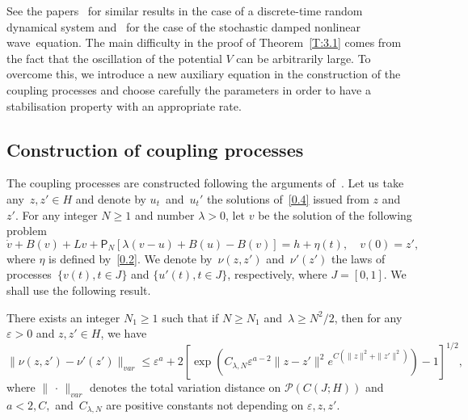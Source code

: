 \documentclass[10pt]{amsart}
\theoremstyle{definition}\newtheorem{defi}[theo]{Definition}\newtheorem{rema}[theo]{Remark}\newtheorem{exam}[theo]{Example}\newtheorem{exem}[theo]{Example}\newtheorem{nota}[theo]{Notation}
\newcommand{\e}{\varepsilon}
\newcommand{\PP}{{\mathcal P}}
\newcommand{\la}{\lambda}
\begin{document}
See the papers~\cite{JNPS-2012, JNPS-2014, MN-2017} for similar results in the case of a discrete-time random dynamical system and~\cite{MN-2015} for the case of the stochastic damped nonlinear wave~equation. The main difficulty in the proof of Theorem~\ref{T:3.1} comes from the fact that the oscillation of the potential $V$ can be arbitrarily large. To overcome this, we introduce a new auxiliary equation in the construction of the coupling processes and choose carefully the parameters in order to have a stabilisation property with an appropriate rate.

\subsection{Construction of coupling processes} \label{S:3.1}

The coupling processes are constructed following the arguments of~\cite{MN-2015}. Let us take any~$z,z' \in H$ and denote by $u_t$~and~$u_t'$ the solutions of~\eqref{0.4} issued from $z$ and~$z'$. For any integer $N\ge 1$ and number $\la>0$, let $v$ be the solution of the following problem
\begin{equation}\label{auxi}
\dot v + B(v) + Lv + {\mathsf P}_N[\la(v-u)+B(u)-B(v)] = h + \eta(t), \quad v(0)=z',
\end{equation}
where $\eta$ is defined by~\eqref{0.2}. We denote by~$\nu(z,z')$ and~$\nu'(z')$ the laws of processes~$\{v(t), t\in J\}$ and $\{u'(t), t\in J\}$, respectively, where $J=[0,1]$. We shall use the following result.

\begin{prop}\label{P:dist}
There exists an integer $N_1\ge1$ such that if $N\ge N_1$ and~$\la\ge N^2/2 $, then for any~$\e>0$ and $z,z'\in H$, we have
\begin{equation}\label{eoejtnvf}
\| \nu(z,z')-\nu'(z')\|_{var}\le \e^a+ 2 \left[\exp\left(C_{\la,N} \e^{a-2}\|z-z'\|^2 e^{C(\|z\|^2+\|z'\|^2)} \right)-1\right]^{1/2},
\end{equation}
where $\|{\,\cdot\,}\|_{var}$ denotes the total variation distance on $\PP(C(J; H))$ and $a<2, C,$ and~$C_{\la,N}$ are positive constants not depending on $\e, z,z'$.
\end{prop}
\end{document}
